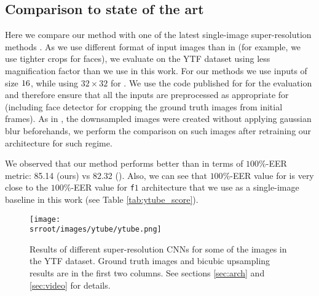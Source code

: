 \subsection{Comparison to state of the art}

Here we compare our method with one of the latest single-image super-resolution methods \cite{ZhuLLT16}. As we use different format of input images than in \cite{ZhuLLT16} (for example, we use tighter crops for faces), we evaluate \cite{ZhuLLT16} on the YTF dataset using less magnification factor than we use in this work. For our methods we use inputs of size $16\time16$, while using $32\times32$ for \cite{ZhuLLT16}. We use the code published for \cite{ZhuLLT16} for the evaluation and therefore ensure that all the inputs are preprocessed as appropriate for \cite{ZhuLLT16} (including face detector for cropping the ground truth images from initial frames). As in \cite{ZhuLLT16}, the downsampled images were created without applying gaussian blur beforehands, we perform the comparison on such images after retraining our architecture for such regime. 

We observed that our method performs better than \cite{ZhuLLT16} in terms of $100$\%-EER metric: 85.14 (ours) vs 82.32 (\cite{ZhuLLT16}). Also, we can see that $100$\%-EER value for \cite{ZhuLLT16} is very close to the $100$\%-EER value for \texttt{f$1$} architecture that we use as a single-image baseline in this work (see Table \ref{tab:ytube_score}).




\begin{figure*}
\begin{center}

\texttt{[image: \\srroot/images/ytube/ytube.png]}

\caption{Results of different super-resolution CNNs for some of the images in the YTF dataset. Ground truth images and bicubic upsampling results are in the first two columns. See sections \ref{sec:arch} and \ref{sec:video} for details.}

\label{fig:ytube}

\end{center}

\end{figure*}